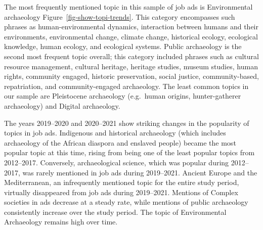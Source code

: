 \documentclass[
  12pt,
]{article}
\begin{document}
The most frequently mentioned topic in this sample of job ads is
Environmental archaeology Figure~\ref{fig-show-topi-trends}. This
category encompasses such phrases as human-environmental dynamics,
interaction between humans and their environments, environmental change,
climate change, historical ecology, ecological knowledge, human ecology,
and ecological systems. Public archaeology is the second most frequent
topic overall; this category included phrases such as cultural resource
management, cultural heritage, heritage studies, museum studies, human
rights, community engaged, historic preservation, social justice,
community-based, repatriation, and community-engaged archaeology. The
least common topics in our sample are Pleistocene archaeology
(e.g.~human origins, hunter-gatherer archaeology) and Digital
archaeology.

The years 2019--2020 and 2020--2021 show striking changes in the
popularity of topics in job ads. Indigenous and historical archaeology
(which includes archaeology of the African diaspora and enslaved people)
became the most popular topic at this time, rising from being one of the
least popular topics from 2012--2017. Conversely, archaeological
science, which was popular during 2012--2017, was rarely mentioned in
job ads during 2019--2021. Ancient Europe and the Mediterranean, an
infrequently mentioned topic for the entire study period, virtually
disappeared from job ads during 2019--2021. Mentions of Complex
societies in ads decrease at a steady rate, while mentions of public
archaeology consistently increase over the study period. The topic of
Environmental Archaeology remains high over time.
\end{document}
